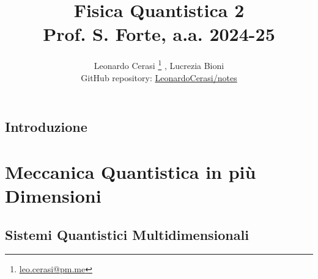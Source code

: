 \documentclass[a4paper, 12pt, openany]{book}
\author{Leonardo Cerasi%
	\thanks{\scriptsize\href{mailto:leonardo.cerasi@studenti.unimi.it}{leo.cerasi@pm.me}}%
	, Lucrezia Bioni\\
	\small GitHub repository: \href{https://github.com/LeonardoCerasi/notes}{LeonardoCerasi/notes}}
\title{\Huge\textbf{Fisica Quantistica 2} \\ \large Prof. S. Forte, a.a. 2024-25}
\begin{document}
\frontmatter

\maketitle
\tableofcontents

\mainmatter

\chapter*{Introduzione}


\part{Meccanica Quantistica in più Dimensioni}

\chapter{Sistemi Quantistici Multidimensionali}

\end{document}
